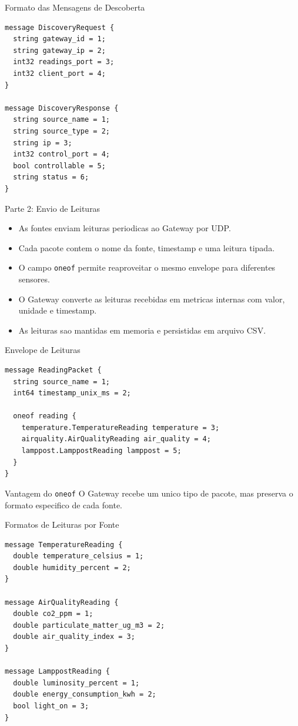 \documentclass[aspectratio=169]{beamer}
\begin{document}
\begin{frame}[fragile]{Formato das Mensagens de Descoberta}
\begin{lstlisting}[style=proto]
message DiscoveryRequest {
  string gateway_id = 1;
  string gateway_ip = 2;
  int32 readings_port = 3;
  int32 client_port = 4;
}

message DiscoveryResponse {
  string source_name = 1;
  string source_type = 2;
  string ip = 3;
  int32 control_port = 4;
  bool controllable = 5;
  string status = 6;
}
\end{lstlisting}
\end{frame}

\begin{frame}{Parte 2: Envio de Leituras}
  \begin{itemize}
    \item As fontes enviam leituras periodicas ao Gateway por UDP.
    \item Cada pacote contem o nome da fonte, timestamp e uma leitura tipada.
    \item O campo \texttt{oneof} permite reaproveitar o mesmo envelope para diferentes sensores.
    \item O Gateway converte as leituras recebidas em metricas internas com valor, unidade e timestamp.
    \item As leituras sao mantidas em memoria e persistidas em arquivo CSV.
  \end{itemize}
\end{frame}

\begin{frame}[fragile]{Envelope de Leituras}
\begin{lstlisting}[style=proto]
message ReadingPacket {
  string source_name = 1;
  int64 timestamp_unix_ms = 2;

  oneof reading {
    temperature.TemperatureReading temperature = 3;
    airquality.AirQualityReading air_quality = 4;
    lamppost.LamppostReading lamppost = 5;
  }
}
\end{lstlisting}

  \begin{block}{Vantagem do \texttt{oneof}}
    O Gateway recebe um unico tipo de pacote, mas preserva o formato especifico de cada fonte.
  \end{block}
\end{frame}

\begin{frame}[fragile]{Formatos de Leituras por Fonte}
\begin{lstlisting}[style=proto]
message TemperatureReading {
  double temperature_celsius = 1;
  double humidity_percent = 2;
}

message AirQualityReading {
  double co2_ppm = 1;
  double particulate_matter_ug_m3 = 2;
  double air_quality_index = 3;
}

message LamppostReading {
  double luminosity_percent = 1;
  double energy_consumption_kwh = 2;
  bool light_on = 3;
}
\end{lstlisting}
\end{frame}
\end{document}

